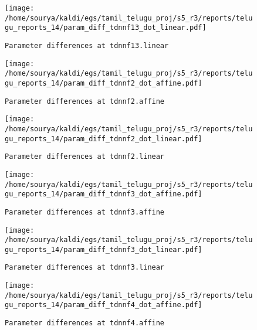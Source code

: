 \documentclass[prl,10pt,twocolumn]{revtex4}
\begin{document}
\newpage
\begin{figure}[h]
  \begin{center}
    \caption{\texttt{Parameter differences at tdnnf13.linear}}
    \texttt{[image: /home/sourya/kaldi/egs/tamil\_telugu\_proj/s5\_r3/reports/telugu\_reports\_14/param\_diff\_tdnnf13\_dot\_linear.pdf]}
  \end{center}
\end{figure}
\clearpage


\newpage
\begin{figure}[h]
  \begin{center}
    \caption{\texttt{Parameter differences at tdnnf2.affine}}
    \texttt{[image: /home/sourya/kaldi/egs/tamil\_telugu\_proj/s5\_r3/reports/telugu\_reports\_14/param\_diff\_tdnnf2\_dot\_affine.pdf]}
  \end{center}
\end{figure}
\clearpage


\newpage
\begin{figure}[h]
  \begin{center}
    \caption{\texttt{Parameter differences at tdnnf2.linear}}
    \texttt{[image: /home/sourya/kaldi/egs/tamil\_telugu\_proj/s5\_r3/reports/telugu\_reports\_14/param\_diff\_tdnnf2\_dot\_linear.pdf]}
  \end{center}
\end{figure}
\clearpage


\newpage
\begin{figure}[h]
  \begin{center}
    \caption{\texttt{Parameter differences at tdnnf3.affine}}
    \texttt{[image: /home/sourya/kaldi/egs/tamil\_telugu\_proj/s5\_r3/reports/telugu\_reports\_14/param\_diff\_tdnnf3\_dot\_affine.pdf]}
  \end{center}
\end{figure}
\clearpage


\newpage
\begin{figure}[h]
  \begin{center}
    \caption{\texttt{Parameter differences at tdnnf3.linear}}
    \texttt{[image: /home/sourya/kaldi/egs/tamil\_telugu\_proj/s5\_r3/reports/telugu\_reports\_14/param\_diff\_tdnnf3\_dot\_linear.pdf]}
  \end{center}
\end{figure}
\clearpage


\newpage
\begin{figure}[h]
  \begin{center}
    \caption{\texttt{Parameter differences at tdnnf4.affine}}
    \texttt{[image: /home/sourya/kaldi/egs/tamil\_telugu\_proj/s5\_r3/reports/telugu\_reports\_14/param\_diff\_tdnnf4\_dot\_affine.pdf]}
  \end{center}
\end{figure}
\clearpage
\end{document}
